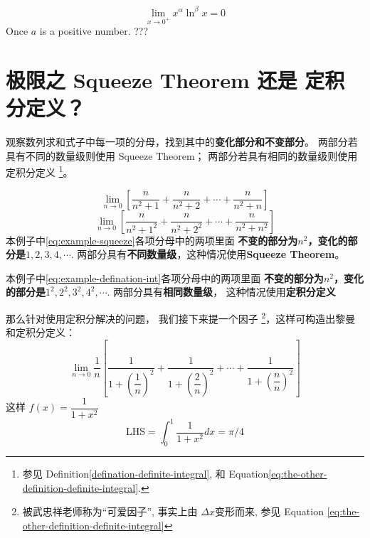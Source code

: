\begin{lemma}
    \[
        \lim_{x \to 0^+} x^{\alpha} \ln^{\beta}x = 0
    \]
    Once $a$ is a positive number. ??? %
\end{lemma}

\section{极限之 Squeeze Theorem 还是 定积分定义？}
\label{use-squeeze-or-definition-of-integral}

观察数列求和式子中每一项的分母，找到其中的\textbf{变化部分和不变部分}。
两部分若具有不同的数量级则使用 Squeeze Theorem；
两部分若具有相同的数量级则使用 定积分定义
\footnote{
    参见 Definition\ref{defination-definite-integral},
    和 Equation\ref{eq:the-other-definition-definite-integral}.
}。

\begin{example}
    \begin{equation} \label{eq:example-squeeze}
        \lim_{n \to 0} \left[ 
        \dfrac{n}{n^2+1} + \dfrac{n}{n^2+2} + \cdots + \dfrac{n}{n^2+n} 
        \right]  
    \end{equation}
    \begin{equation} \label{eq:example-defination-int}
        \lim_{n \to 0} \left[ 
        \dfrac{n}{n^2+1^2} + \dfrac{n}{n^2+2^2} + \cdots + \dfrac{n}{n^2+n^2} 
        \right]  
    \end{equation}
    本例子中\ref{eq:example-squeeze}各项分母中的两项里面
    \textbf{不变的部分为$n^2$，变化的部分是$1,2,3,4,\cdots$}.
    两部分具有\textbf{不同数量级}，这种情况使用\textbf{Squeeze Theorem}。

    本例子中\ref{eq:example-defination-int}各项分母中的两项里面
    \textbf{不变的部分为$n^2$，变化的部分是$1^2,2^2,3^2,4^2,\cdots$}.
    两部分具有\textbf{相同数量级}，
    这种情况使用\textbf{定积分定义}

    那么针对使用定积分解决的问题，
    我们接下来提一个因子
    \footnote{
        被武忠祥老师称为“可爱因子”, 事实上由 
        $\Delta x$变形而来, 
        参见 Equation \ref{eq:the-other-definition-definite-integral}
    }，这样可构造出黎曼和定积分定义：
    \begin{equation*}
        \lim_{n \to 0} \dfrac{1}{n} \left[ 
        \dfrac{1}{1+\left(\dfrac{1}{n}\right)^2} + 
        \dfrac{1}{1+\left(\dfrac{2}{n}\right)^2} + \cdots + 
        \dfrac{1}{1+\left(\dfrac{n}{n}\right)^2}
        \right]  
    \end{equation*}
    这样 $f(x) = \dfrac{1}{1+x^2}$
    \begin{equation*}
        \mbox{LHS} = \int_{0}^{1} \dfrac{1}{1+x^2} dx = \pi / 4
    \end{equation*}
\end{example}

